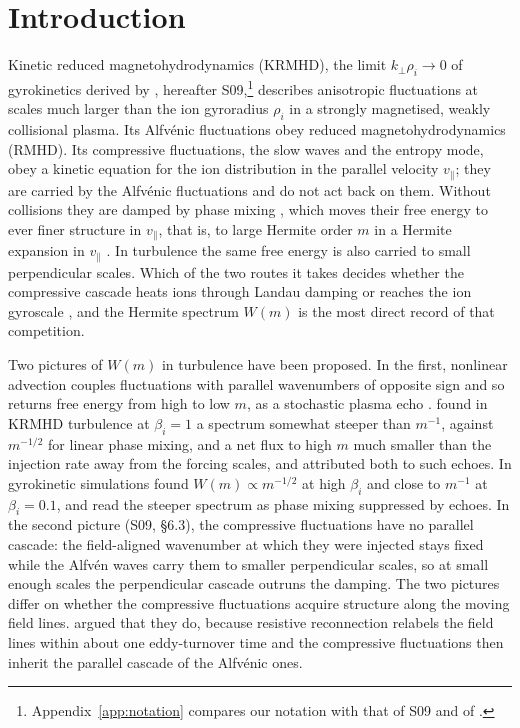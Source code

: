 \section{Introduction}\label{sec:intro}

Kinetic reduced magnetohydrodynamics (KRMHD), the limit $k_\perp\rho_i\to0$ of gyrokinetics derived by \citet{Schekochihin2009}, hereafter S09,\footnote{Appendix~\ref{app:notation} compares our notation with that of S09 and of \citet{Chandran2026}.} describes anisotropic fluctuations at scales much larger than the ion gyroradius $\rho_i$ in a strongly magnetised, weakly collisional plasma. Its Alfv\'enic fluctuations obey reduced magnetohydrodynamics (RMHD). Its compressive fluctuations, the slow waves and the entropy mode, obey a kinetic equation for the ion distribution in the parallel velocity $v_\parallel$; they are carried by the Alfv\'enic fluctuations and do not act back on them. Without collisions they are damped by phase mixing \citetext{\citealp{Barnes1966}; S09, \S6.2}, which moves their free energy to ever finer structure in $v_\parallel$, that is, to large Hermite order $m$ in a Hermite expansion in $v_\parallel$ \citep{ZoccoSchekochihin2011,Kanekar2015,Schekochihin2016}. In turbulence the same free energy is also carried to small perpendicular scales. Which of the two routes it takes decides whether the compressive cascade heats ions through Landau damping or reaches the ion gyroscale \citep[S09;][]{Schekochihin2016,Meyrand2019,Kawazura2019,Kawazura2020}, and the Hermite spectrum $W(m)$ is the most direct record of that competition.

Two pictures of $W(m)$ in turbulence have been proposed. In the first, nonlinear advection couples fluctuations with parallel wavenumbers of opposite sign and so returns free energy from high to low $m$, as a stochastic plasma echo \citep{KanekarThesis2015,Schekochihin2016,Parker2016,AdkinsSchekochihin2018}. \citet{Meyrand2019} found in KRMHD turbulence at $\beta_i=1$ a spectrum somewhat steeper than $m^{-1}$, against $m^{-1/2}$ for linear phase mixing, and a net flux to high $m$ much smaller than the injection rate away from the forcing scales, and attributed both to such echoes. In gyrokinetic simulations \citet{Kawazura2019,Kawazura2020} found $W(m)\propto m^{-1/2}$ at high $\beta_i$ and close to $m^{-1}$ at $\beta_i=0.1$, and read the steeper spectrum as phase mixing suppressed by echoes. In the second picture (S09, \S6.3), the compressive fluctuations have no parallel cascade: the field-aligned wavenumber at which they were injected stays fixed while the Alfv\'en waves carry them to smaller perpendicular scales, so at small enough scales the perpendicular cascade outruns the damping. The two pictures differ on whether the compressive fluctuations acquire structure along the moving field lines. \citet{Meyrand2019} argued that they do, because resistive reconnection relabels the field lines within about one eddy-turnover time and the compressive fluctuations then inherit the parallel cascade of the Alfv\'enic ones.

